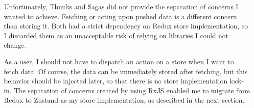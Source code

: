 Unfortunately,
Thunks and Sagas did not provide the separation of concerns
I wanted to achieve.
Fetching or acting upon pushed data
is a different concern than storing it.
Both had a strict dependency on Redux
store implementation,
so I discarded them as an unacceptable risk
of relying on libraries I could not change.

As a user,
I should not have to dispatch an action on a store
when I want to fetch data.
Of course, the data can be immediately stored after fetching,
but this behavior should be injected later,
so that there is no store implementation lock-in.
The separation of concerns created by using RxJS
enabled me to migrate from Redux to Zustand
as my store implementation,
as described in the next section.
